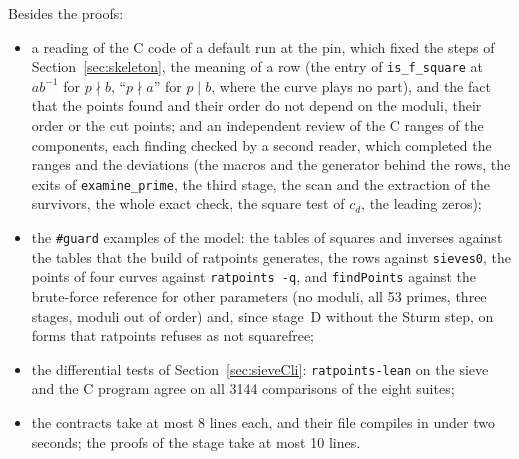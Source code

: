 Besides the proofs:
\begin{itemize}
  \item a reading of the C code of a default run at the pin, which fixed the steps of
    Section~\ref{sec:skeleton}, the meaning of a row (the entry of \verb|is_f_square| at
    $a b^{-1}$ for $p \nmid b$, ``$p \nmid a$'' for $p \mid b$, where the curve plays no part),
    and the fact that the points found and their order do not depend on the moduli, their order or
    the cut points; and an independent review of the C ranges of the components, each finding
    checked by a second reader, which completed the ranges and the deviations (the macros and the
    generator behind the rows, the exits of \verb|examine_prime|, the third stage, the scan and
    the extraction of the survivors, the whole exact check, the square test of $c_d$, the leading
    zeros);
  \item the \verb|#guard| examples of the model: the tables of squares and inverses against the
    tables that the build of ratpoints generates, the rows against \verb|sieves0|, the points of
    four curves against \verb|ratpoints -q|, and \verb|findPoints| against the brute-force reference
    for other parameters (no moduli, all 53 primes, three stages, moduli out of order) and, since
    stage~D without the Sturm step, on forms that ratpoints refuses as not squarefree;
  \item the differential tests of Section~\ref{sec:sieveCli}: \verb|ratpoints-lean| on the sieve
    and the C program agree on all 3144 comparisons of the eight suites;
  \item the contracts take at most 8 lines each, and their file compiles in under two seconds; the
    proofs of the stage take at most 10 lines.
\end{itemize}
